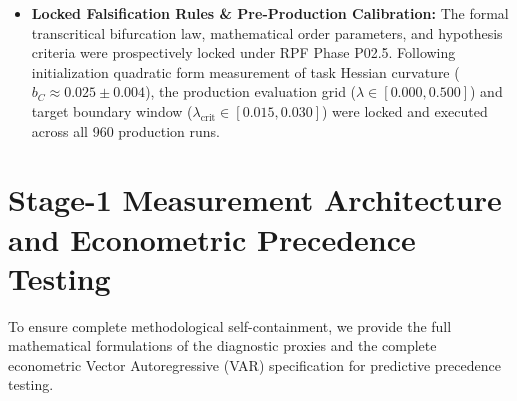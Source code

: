 \documentclass{article}
\theoremstyle{plain}
\theoremstyle{definition}
\begin{document}
\begin{itemize}[leftmargin=*,noitemsep]
\begin{enumerate}[label=(\alph*),noitemsep]
        \item \texttt{pairwise\_welch\_tost.csv} (SHA-256: \texttt{4900762428918c0776e05798321f3172637d9e08fe54e17c31e6359a95731e40}): Full pairwise Welch $t$-tests and TOST equivalence statistics across all 10 supercritical $\lambda$ pairs with Bonferroni/Holm adjustments.
        \item \texttt{granger\_causality\_results.csv} (SHA-256: \texttt{e86344cb1f646b153bbe13ac9cea6876d653d6e2966196b5687fcc7a547ad4f6}): Bivariate panel VAR(2) Granger causality $F$-tests, lag selection criteria (AIC/BIC/HQIC), ADF stationarity statistics, and wild cluster bootstrap $p$-values.
        \item \texttt{inflection\_breakpoints.csv} (SHA-256: \texttt{fe1ef4f502bfe2cc0ea39451a6c58cc1e0e2e75738cb6647bba9eb21bdd1100d}): Fitted logistic change-point parameters ($\hat{\lambda}_{\text{crit}}$, steepness $k$, and $R^2$) across all benchmark suites and neural architectures.
        \item \texttt{cka\_trajectories.csv} (SHA-256: \texttt{393b2c125105fa17aaa92aefb77ec2444adc92f3bb76cd5ba5bbf81305aadb6f}): Step-by-step layerwise linear CKA representation trajectories across seeds and conditions.
        \item \texttt{theoretical\_separatrix.csv} (SHA-256: \texttt{e4a9a91b2dce5963823ce29fe5155cbafd4f3e0f004d802a6884ab545fd7f9b8}): Analytical vector field solutions and Lyapunov function evaluations.
    \end{enumerate}
\item \textbf{Locked Falsification Rules \& Pre-Production Calibration:} The formal transcritical bifurcation law, mathematical order parameters, and hypothesis criteria were prospectively locked under RPF Phase P02.5. Following initialization quadratic form measurement of task Hessian curvature ($b_C \approx 0.025 \pm 0.004$), the production evaluation grid ($\lambda \in [0.000, 0.500]$) and target boundary window ($\lambda_{\text{crit}} \in [0.015, 0.030]$) were locked and executed across all 960 production runs.
\end{itemize}
\section{Stage-1 Measurement Architecture and Econometric Precedence Testing}
\label{sec:appendix_stage1_proxy}

To ensure complete methodological self-containment, we provide the full mathematical formulations of the diagnostic proxies and the complete econometric Vector Autoregressive (VAR) specification for predictive precedence testing.
\end{document}
